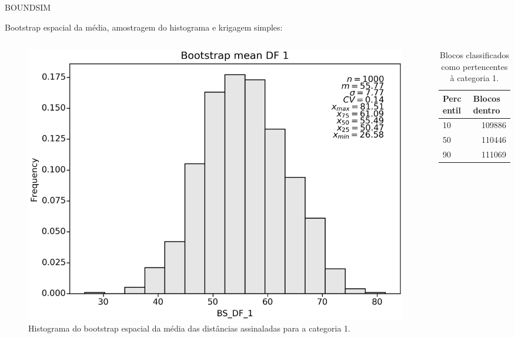 \documentclass[aspectratio=169]{beamer}
\begin{document}
\begin{frame}{BOUNDSIM}

Bootstrap espacial da média, amostragem do histograma e krigagem simples:

\begin{columns}
	\begin{column}{0.5\textwidth}
	\begin{figure}[H]
		\caption{\label{bs_df_1}Histograma do bootstrap espacial da média das distâncias assinaladas para a categoria 1.}
		\begin{center}
			\includegraphics[width=\textwidth]{capitulo_2/BS_DF_1.png}
		\end{center}
	\end{figure}
	\end{column}
	\begin{column}{0.5\textwidth}  %
	\begin{table}[H]
		\begin{center}
			\begin{tabular}{lr}
				Percentil & \multicolumn{1}{l}{Blocos dentro} \\ \hline
				10 & 109886 \\
				50 & 110446 \\
				90 & 111069 \\ \hline
			\end{tabular}
		\end{center}
		\caption{Blocos classificados como pertencentes à categoria 1.}\label{boundsim_table}
	\end{table}
	\end{column}
\end{columns}

\end{frame}
\end{document}
